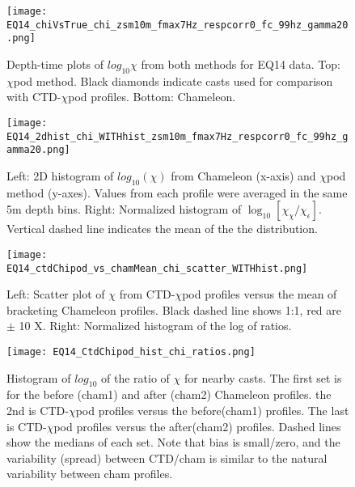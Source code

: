 \documentclass{ametsoc}
\begin{document}
\begin{figure}[t]
  \noindent\texttt{[image: EQ14\_chiVsTrue\_chi\_zsm10m\_fmax7Hz\_respcorr0\_fc\_99hz\_gamma20.png]}\\
  \caption{Depth-time plots of $log_{10}\chi$ from both methods for EQ14 data. Top: $\chi$pod method. Black diamonds indicate casts used for comparison with CTD-$\chi$pod profiles. Bottom: Chameleon.}
  \label{eq14_eps_pcolor}
\end{figure}


\begin{figure}[t]
  \noindent\texttt{[image: EQ14\_2dhist\_chi\_WITHhist\_zsm10m\_fmax7Hz\_respcorr0\_fc\_99hz\_gamma20.png]}\\
  \caption{Left: 2D histogram of $log_{10}(\chi)$ from Chameleon (x-axis) and $\chi$pod method (y-axes). Values from each profile were averaged in the same 5m depth bins. Right: Normalized histogram of $\log_{10}[\chi_{\chi}/\chi_{\epsilon}]$. Vertical dashed line indicates the mean of the the distribution.}
  \label{eq14_chi_2dhist}
\end{figure}


\begin{figure}[t]
  \noindent\texttt{[image: EQ14\_ctdChipod\_vs\_chamMean\_chi\_scatter\_WITHhist.png]}\\
  \caption{Left: Scatter plot of $\chi$ from CTD-$\chi$pod profiles versus the mean of bracketing Chameleon profiles. Black dashed line shows 1:1, red are $\pm$ 10 X. Right: Normalized histogram of the log of ratios.}
  \label{eq14_cdtChi_vs_cham}
\end{figure}

\begin{figure}[t]
  \noindent\texttt{[image: EQ14\_CtdChipod\_hist\_chi\_ratios.png]}\\
  \caption{Histogram of $log_{10}$ of the ratio of $\chi$ for nearby casts. The first set is for the before (cham1) and after (cham2) Chameleon profiles. the 2nd is CTD-$\chi$pod profiles versus the before(cham1) profiles. The last is CTD-$\chi$pod profiles versus the after(cham2) profiles. Dashed lines show the medians of each set.  Note that bias is small/zero, and the variability (spread) between CTD/cham is similar to the natural variability between cham profiles.}
  \label{eq14_cdtChi_vs_cham_hist}
\end{figure}
\end{document}
